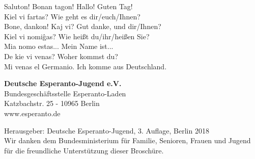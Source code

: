 {
Saluton! Bonan tagon! \hfill Hallo! Guten Tag!\\
Kiel vi fartas?       \hfill Wie geht es dir/euch/Ihnen?\\
Bone, dankon! Kaj vi? \hfill Gut danke, und dir/Ihnen?\\
Kiel vi nomiĝas?      \hfill Wie heißt du/ihr/heißen Sie?\\
Mia nomo estas...     \hfill Mein Name ist...\\
De kie vi venas?      \hfill Woher kommst du?\\
Mi venas el Germanio. \hfill Ich komme aus Deutschland.
}
	
\begin{framed}
{\centering
\textbf{Deutsche Esperanto-Jugend e.V.} \\
Bundesgeschäftsstelle Esperanto-Laden\\
Katzbachstr. 25 - 10965 Berlin\\
www.esperanto.de\\
}
\end{framed}

\vspace{-.4cm}

{\footnotesize Herausgeber: Deutsche Esperanto-Jugend, 3. Auflage, Berlin 2018 \\
Wir danken dem Bundesministerium für Familie, Senioren, Frauen und Jugend für die freundliche Unterstützung dieser Broschüre. }


\noindent
{}